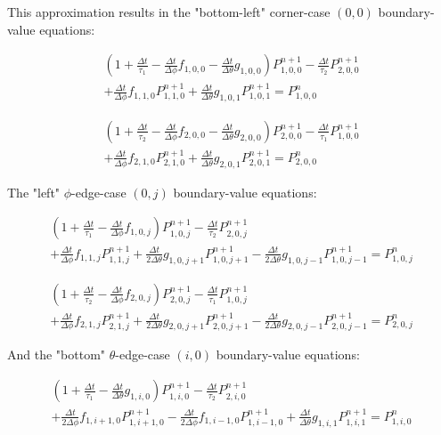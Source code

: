 \documentclass[12pt,a4paper,pagesize=pdftex]{scrartcl}
\begin{document}
This approximation results in the "bottom-left" corner-case \(\left(0,0\right)\) boundary-value equations:

\begin{multline*}
    \left(1 + \frac{\Delta t}{\tau_1} - \frac{\Delta t}{\Delta \phi} f_{1,0,0} - \frac{\Delta t}{\Delta \theta}g_{1,0,0}\right) P^{n+1}_{1,0,0} - \frac{\Delta t}{\tau_2} P^{n+1}_{2,0,0} \\+ \frac{\Delta t}{\Delta \phi} f_{1,1,0} P^{n+1}_{1,1,0} + \frac{\Delta t}{\Delta \theta} g_{1,0,1} P^{n+1}_{1,0,1} = P^n_{1,0,0}
\end{multline*}

\begin{multline*}
    \left(1 + \frac{\Delta t}{\tau_2} - \frac{\Delta t}{\Delta \phi} f_{2,0,0} - \frac{\Delta t}{\Delta \theta}g_{2,0,0}\right) P^{n+1}_{2,0,0} - \frac{\Delta t}{\tau_1} P^{n+1}_{1,0,0} \\+ \frac{\Delta t}{\Delta \phi} f_{2,1,0} P^{n+1}_{2,1,0} + \frac{\Delta t}{\Delta \theta} g_{2,0,1} P^{n+1}_{2,0,1} = P^n_{2,0,0}
\end{multline*}

The "left" \(\phi\)-edge-case \(\left(0,j\right)\) boundary-value equations:

\begin{multline*}
    \left(1 + \frac{\Delta t}{\tau_1} - \frac{\Delta t}{\Delta \phi} f_{1,0,j}\right) P^{n+1}_{1,0,j} - \frac{\Delta t}{\tau_2} P^{n+1}_{2,0,j} \\+ \frac{\Delta t}{\Delta \phi} f_{1,1,j} P^{n+1}_{1,1,j} + \frac{\Delta t}{2 \Delta \theta} g_{1,0,j+1} P^{n+1}_{1,0,j+1} - \frac{\Delta t}{2 \Delta \theta}g_{1,0,j-1} P^{n+1}_{1,0,j-1} = P^n_{1,0,j}
\end{multline*}

\begin{multline*}
    \left(1 + \frac{\Delta t}{\tau_2} - \frac{\Delta t}{\Delta \phi} f_{2,0,j}\right) P^{n+1}_{2,0,j} - \frac{\Delta t}{\tau_1} P^{n+1}_{1,0,j} \\+ \frac{\Delta t}{\Delta \phi} f_{2,1,j} P^{n+1}_{2,1,j} + \frac{\Delta t}{2 \Delta \theta} g_{2,0,j+1} P^{n+1}_{2,0,j+1} - \frac{\Delta t}{2 \Delta \theta}g_{2,0,j-1} P^{n+1}_{2,0,j-1} = P^n_{2,0,j}
\end{multline*}

And the "bottom" \(\theta\)-edge-case \(\left(i,0\right)\) boundary-value equations:

\begin{multline*}
    \left(1 + \frac{\Delta t}{\tau_1} - \frac{\Delta t}{\Delta \theta}g_{1,i,0}\right)P^{n+1}_{1,i,0} - \frac{\Delta t}{\tau_2}P^{n+1}_{2,i,0} \\+ \frac{\Delta t}{2 \Delta \phi} f_{1,i+1,0} P^{n+1}_{1,i+1,0} - \frac{\Delta t}{2 \Delta \phi} f_{1,i-1,0} P^{n+1}_{1,i-1,0} + \frac{\Delta t}{\Delta \theta} g_{1,i,1} P^{n+1}_{1,i,1} = P^n_{1,i,0}
\end{multline*}
\end{document}
